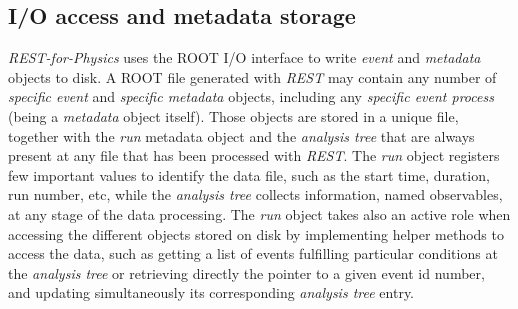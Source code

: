 



\subsection{I/O access and metadata storage}



\emph{REST-for-Physics} uses the ROOT I/O interface to write \emph{event} and \emph{metadata} objects to disk. A ROOT file generated with \emph{REST} may contain any number of \emph{specific event} and \emph{specific metadata} objects, including any \emph{specific event process} (being a \emph{metadata} object itself). Those objects are stored in a unique file, together with the \emph{run} metadata object and the \emph{analysis tree} that are always present at any file that has been processed with \emph{REST}. The \emph{run} object registers few important values to identify the data file, such as the start time, duration, run number, etc, while the \emph{analysis tree} collects information, named observables, at any stage of the data processing. The \emph{run} object takes also an active role when accessing the different objects stored on disk by implementing helper methods to access the data, such as getting a list of events fulfilling particular conditions at the \emph{analysis tree} or retrieving directly the pointer to a given event id number, and updating simultaneously its corresponding \emph{analysis tree} entry.

